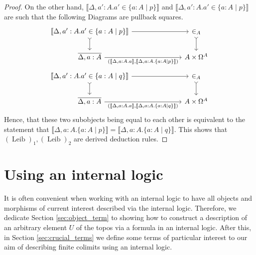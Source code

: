 \documentclass{birkjour}
\theoremstyle{plain}
\theoremstyle{definition}
\begin{document}
\begin{proof}
		On the other hand, $\llbracket \Delta, a':A. a' \in \lbrace a:A \mid p \rbrace \rrbracket$ and $\llbracket \Delta, a':A. a' \in \lbrace a:A \mid p \rbrace \rrbracket$ are such that the following Diagrams are pullback squares.
		\begin{equation}
			\begin{tikzcd}[column sep = large]
				\llbracket \Delta, a':A. a' \in \lbrace a:A \mid p \rbrace \rrbracket\arrow[d,rightarrowtail]\arrow[rr] && \in_A\arrow[d,rightarrowtail]\\
				\overline{\Delta, a:A}\arrow[rr,swap,"{(\llbracket \Delta, a:A.a\rrbracket, \llbracket \Delta,a:A. \lbrace a:A \mid p \rbrace\rrbracket)}"] && A \times \Omega^A
			\end{tikzcd}
		\end{equation}
		\begin{equation}
			\begin{tikzcd}[column sep = large]
				\llbracket \Delta, a':A. a' \in \lbrace a:A \mid q \rbrace \rrbracket\arrow[d,rightarrowtail]\arrow[rr] && \in_A\arrow[d,rightarrowtail]\\
				\overline{\Delta, a:A}\arrow[rr,swap,"{(\llbracket \Delta, a:A.a\rrbracket, \llbracket \Delta,a:A. \lbrace a:A \mid q \rbrace\rrbracket)}"] && A \times \Omega^A
			\end{tikzcd}
		\end{equation}
		Hence, that these two subobjects being equal to each other is equivalent to the statement that $\llbracket \Delta, a:A. \lbrace a :A \mid p \rbrace \rrbracket = \llbracket \Delta, a:A. \lbrace a:A \mid q \rbrace \rrbracket$. This shows that $(\operatorname{Leib})_1,(\operatorname{Leib})_2$ are derived deduction rules.
	\end{proof}
	
	\section{Using an internal logic}\label{sec:crucial_lemma}
	It is often convenient when working with an internal logic to have all objects and morphisms of current interest described via the internal logic. Therefore, we dedicate Section \ref{sec:object_term} to showing how to construct a description of an arbitrary element $U$ of the topos via a formula in an internal logic. After this, in Section \ref{sec:crucial_terms} we define some terms of particular interest to our aim of describing finite colimits using an internal logic.
\end{document}
